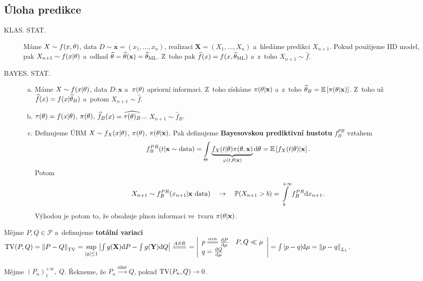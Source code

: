 \subsection*{Úloha predikce}
\begin{description}
	\item[KLAS. STAT.] Máme $X\sim f(x,\theta)$, data $D\sim\textbf{x}=(x_1,...,x_n)$, realizaci $\textbf{X}=(X_1,...,X_n)$ a~hledáme predikci $X_{n+1}$. Pokud použijeme IID model, pak $X_{n+1}\sim f(x|\theta)$ a~odhad $\widehat{\theta}=\widehat{\theta}(\textbf{x})=\widehat{\theta}_{\mathrm{ML}}$. Z~toho pak $\widehat{f}(x)=f(x,\widehat{\theta}_\mathrm{ML})$ a~z~toho $X_{n+1}\sim\widehat{f}$.
	\item[BAYES. STAT.] \begin{enumerate}[a)]
		\item Máme $X\sim f(x|\theta)$, data $D:\textbf{x}$ a~$\pi(\theta)$ apriorní informaci. Z~toho získáme $\pi(\theta|\textbf{x})$ a~z~toho $\widehat{\theta}_B=\mathbb{E}\left[ \pi(\theta|\textbf{x}) \right]$. Z~toho už $\widehat{f}(x)=f(x|\widehat{\theta}_B)$ a~potom $X_{n+1}\sim\widehat{f}$.
		\item $\tau(\theta)=f(x|\theta)$, $\pi(\theta)$, $\widehat{f}_B(x)=\widehat{\tau(\theta)_B}$... $X_{n+1}\sim\widehat{f}_B$.
		\item Definujeme ÚBM $X\sim f_X(x|\theta)$, $\pi(\theta)$, $\pi(\theta|\textbf{x})$. Pak definujeme \textbf{Bayesovskou prediktivní hustotu} $f_B^{PR} $ vztahem
		$$ f_B^{PR}(t|\textbf{x}\sim\text{data})=\int\limits_{\Theta} \underbrace{f_X(t|\theta)\pi(\theta,\textbf{x})}_{\varphi(t,\theta|\textbf{x})}\mathrm{d}\theta=\mathbb{E}\left[ f_X(t|\theta)|\textbf{x} \right].$$
		Potom
		$$ X_{n+1}\sim f_B^{PR}(x_{n+1}|\textbf{x}\text{ data})\quad\to\quad \mathbb{P}(X_{n+1}>b)=\int\limits_b^{+\infty}f_B^{PR}\mathrm{d} x_{n+1}.$$
		Výhodou je potom to, že obsahuje plnou informaci ve~tvaru $\pi(\theta|\textbf{x})$.
	\end{enumerate}
\end{description}
\begin{define}
	Mějme $P,Q\in\mathcal{P}$ a~definujeme \textbf{totální variaci} $\TV(P,Q)=\left\|P-Q\right\|_\TV=\sup\limits_{|g|\leq 1}\left| \int g(\X)\d P-\int g(\Y)\d Q \right|\equal{ASR}=\left|\begin{array}{l}
	p\equal{ozn}\frac{\d P}{\d \mu}\quad P,Q\ll\mu\\ q=\frac{\d Q}{\d \mu}
	\end{array}
	\right|=\int |p-q|\d\mu=\left\|p-q\right\|_{L_1}$.
\end{define}
\begin{define}
	Mějme $(P_n)_1^{+\infty},~Q$. Řekneme, že $P_n\stackrel{\text{silně}}{\longrightarrow}Q$, pokud $\mathrm{TV}(P_n,Q)\to0$.
\end{define}
